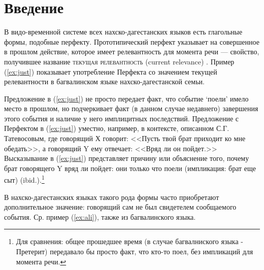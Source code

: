 
\chapter*{Введение} \label{sec:intro}

В видо-временной системе всех нахско-дагестанских языков есть глагольные формы, подобные перфекту. Прототипический перфект указывает на совершенное в прошлом действие, которое имеет релевантность для момента речи --- свойство, получившее название \textsc{текущая релевантность} (current relevance) \citep[24--25]{comrie1985}. Пример (\ref{ex:just}) показывает употребление Перфекта со значением текущей релевантности в багвалинском языке нахско-дагестанской семьи.


Предложение в (\ref{ex:just}) не просто передает факт, что событие `поели' имело место в прошлом, но подчеркивает факт (в данном случае недавнего) завершения этого события и наличие у него имплицитных последствий. Предложение с Перфектом в (\ref{ex:just}) уместно, например, в контексте, описанном С.Г. Татевосовым, где говорящий Х говорит: <<Пусть твой брат приходит ко мне обедать>>, а говорящий Y ему отвечает: <<Вряд ли он пойдет.>> Высказывание в (\ref{ex:just}) представляет причину или объяснение того, почему брат говорящего Y вряд ли пойдет: они только что поели (импликация: брат еще сыт) (ibid.).\footnote{Для сравнения: общее прошедшее время (в случае багвалниского языка - Претерит) передавало бы просто факт, что кто-то поел, без импликаций для момента речи.}
\par В нахско-дагестанских языках такого рода формы часто приобретают дополнительное значение: говорящий сам не был свидетелем сообщаемого события. Ср. пример (\ref{ex:ali}), также из багвалинского языка.\label{p:context}


